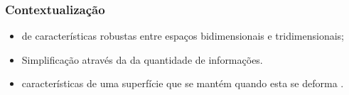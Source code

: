 \begin{frame}
\frametitle{Contextualização}

\begin{itemize}
\item {} de características robustas entre espaços bidimensionais e tridimensionais;
\item Simplificação através da  da quantidade de informações.
\item {} características de uma superfície que se mantém quando esta se deforma \cite{book_difgeosing}. 
\end{itemize}

\end{frame}

